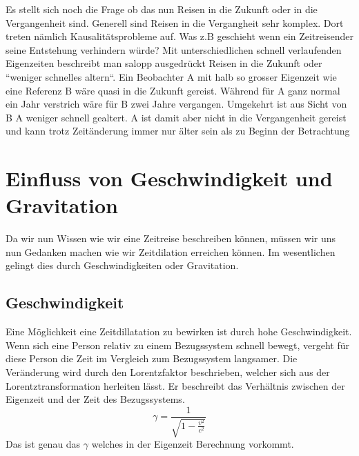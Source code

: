 \begin{refsection}
Es stellt sich noch die Frage ob das nun Reisen in die Zukunft oder in die Vergangenheit sind. Generell sind Reisen in die Vergangheit sehr komplex. Dort treten nämlich Kausalitätsprobleme auf. Was z.B geschieht wenn ein Zeitreisender seine Entstehung verhindern würde?
Mit unterschiedlichen schnell verlaufenden Eigenzeiten beschreibt man salopp ausgedrückt Reisen in die Zukunft oder ``weniger schnelles altern``. Ein Beobachter  A mit halb so grosser Eigenzeit wie eine Referenz B wäre quasi in die Zukunft gereist. Während für A ganz normal ein Jahr verstrich wäre für B zwei Jahre vergangen. Umgekehrt ist aus Sicht von B A weniger schnell gealtert. A ist damit aber nicht in die Vergangenheit gereist und kann trotz Zeit\"anderung immer nur älter sein als zu Beginn der Betrachtung
\section{Einfluss von Geschwindigkeit und Gravitation}
Da wir nun Wissen wie wir eine Zeitreise beschreiben können, müssen wir uns nun Gedanken machen wie wir Zeitdilation erreichen können. Im wesentlichen gelingt dies durch Geschwindigkeiten oder Gravitation. 
\subsection{Geschwindigkeit}
Eine M\"oglichkeit eine Zeitdillatation zu bewirken ist durch hohe Geschwindigkeit. Wenn sich eine Person relativ zu einem Bezugssystem schnell bewegt, vergeht f\"ur diese Person die Zeit im Vergleich zum Bezugssystem langsamer. Die Ver\"anderung wird durch den Lorentzfaktor beschrieben, welcher sich aus der Lorentztransformation herleiten l\"asst. Er beschreibt das Verh\"altnis zwischen der Eigenzeit und der Zeit des Bezugssystems.
\begin{equation}
    \gamma=\frac{1}{\sqrt{1-\displaystyle\frac{v^2}{c^2}}} 
\end{equation}
Das ist genau das $\gamma$ welches in der Eigenzeit Berechnung vorkommt.


\end{refsection}

